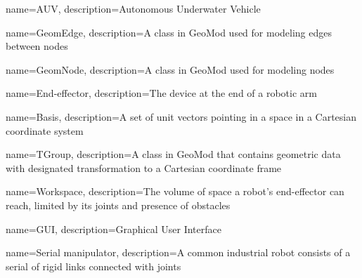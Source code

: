 {
        name=AUV,
        description={Autonomous Underwater Vehicle}
}

{
        name=GeomEdge,
        description={A class in GeoMod used for modeling edges between nodes}
        
}

{
        name=GeomNode,
        description={A class in GeoMod used for modeling nodes}
    
}

{
        name=End-effector,
        description={The device at the end of a robotic arm}
}


{
        name=Basis,
        description={A set of unit vectors pointing in a space in a Cartesian coordinate system}
}

{
        name=TGroup,
        description={A class in GeoMod that contains geometric data with designated transformation to a Cartesian coordinate frame}
}

{
        name=Workspace,
        description={The volume of space a robot's end-effector can reach, limited by its joints and presence of obstacles}
}

{
        name=GUI,
        description={Graphical User Interface}
}

{
        name=Serial manipulator,
        description={A common industrial robot consists of a serial of rigid links connected with joints}
}